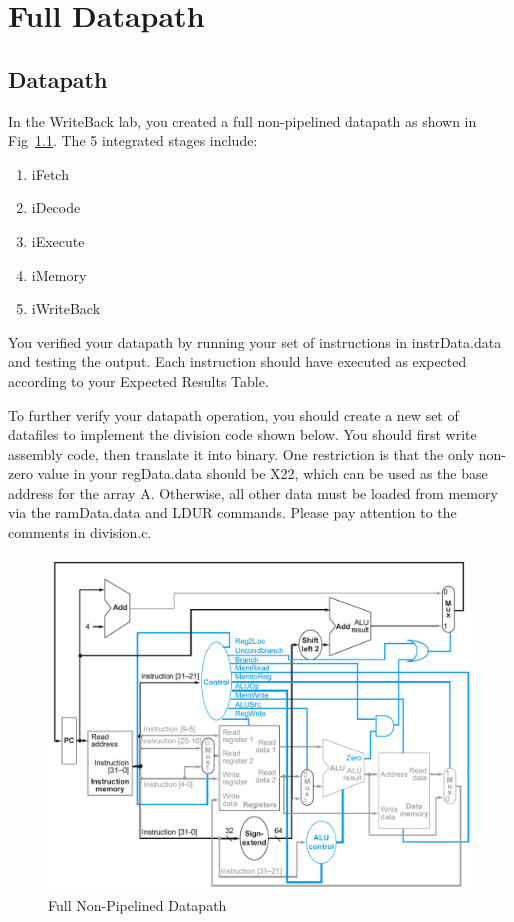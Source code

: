 \chapter{Full Datapath}


\section{Datapath}
In the WriteBack lab, you created a full non-pipelined datapath as shown in Fig~\ref{fig:datapath}.  The 5 integrated stages include:
\begin{enumerate}
\item iFetch
\item iDecode
\item iExecute
\item iMemory
\item iWriteBack
\end{enumerate} 

You verified your datapath by running your set of instructions in instrData.data and testing the output.  Each instruction should have executed as expected according to your Expected Results Table.

To further verify your datapath operation, you should create a new set of datafiles to implement the division code shown below.  You should first write assembly code, then translate it into binary.  One restriction is that the only non-zero value in your regData.data should be X22, which can be used as the base address for the array A.  Otherwise, all other data must be loaded from memory via the ramData.data and LDUR commands.  Please pay attention to the comments in division.c.


\begin{figure}
\caption{Full Non-Pipelined Datapath}\label{fig:datapath}
\begin{center}
\includegraphics[width=\textwidth]{../images/non_pipelined_datapath.png}
\end{center}
\end{figure}

